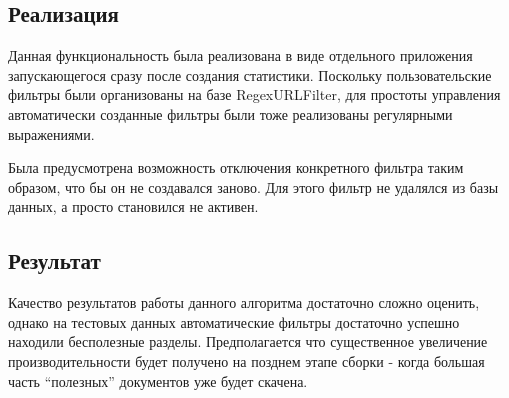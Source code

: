 \subsection{Реализация}
Данная функциональность была реализована в виде отдельного приложения запускающегося сразу после создания статистики. Поскольку пользовательские фильтры были организованы на базе RegexURLFilter, для простоты управления автоматически созданные фильтры были тоже реализованы регулярными выражениями. 

Была предусмотрена возможность отключения конкретного фильтра таким образом, что бы он не создавался заново. Для этого фильтр не удалялся из базы данных, а просто становился не активен.

\subsection{Результат}
Качество результатов работы данного алгоритма достаточно сложно оценить, однако на тестовых данных автоматические фильтры достаточно успешно находили бесполезные разделы. Предполагается что существенное увеличение производительности будет получено на позднем этапе сборки - когда большая часть ``полезных'' документов уже будет скачена.
